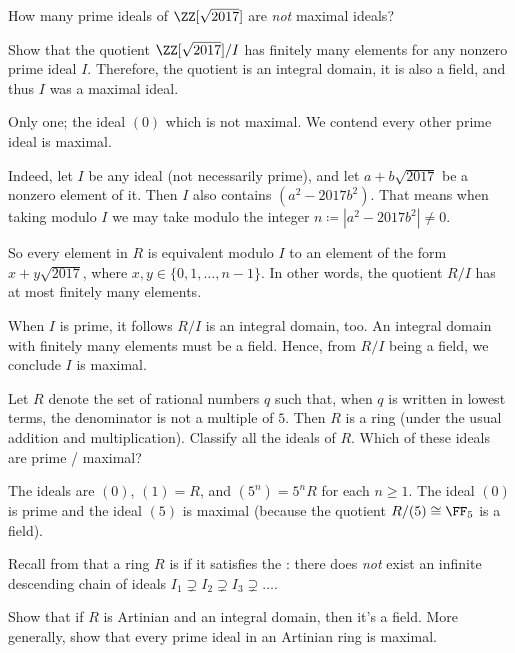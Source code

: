 \begin{dproblem}
	How many prime ideals of $\ZZ[\sqrt{2017}]$ are \emph{not} maximal ideals?
	\label{prob:dedekind_sample}
	\begin{hint}
		Show that the quotient $\ZZ[\sqrt{2017}]/I$ has finitely many elements
		for any nonzero prime ideal $I$.
		Therefore, the quotient is an integral domain, it is also a field,
		and thus $I$ was a maximal ideal.
	\end{hint}
	\begin{sol}
		Only one; the ideal $(0)$ which is not maximal.
		We contend every other prime ideal is maximal.

		Indeed, let $I$ be any ideal (not necessarily prime),
		and let $a + b \sqrt{2017}$ be a nonzero element of it.
		Then $I$ also contains $(a^2-2017b^2)$.
		That means when taking modulo $I$ we may take modulo the integer
		$n \coloneqq |a^2-2017b^2| \neq 0$.

		So every element in $R$ is equivalent modulo $I$
		to an element of the form $x + y \sqrt{2017}$,
		where $x,y \in \{0, 1, \dots, n-1\}$.
		In other words, the quotient $R/I$ has at most finitely many elements.

		When $I$ is prime, it follows $R/I$ is an integral domain, too.
		An integral domain with finitely many elements must be a field.
		Hence, from $R/I$ being a field, we conclude $I$ is maximal.
	\end{sol}
\end{dproblem}

\begin{problem}
	Let $R$ denote the set of rational numbers $q$ such that,
	when $q$ is written in lowest terms, the denominator is not a multiple of $5$.
	Then $R$ is a ring (under the usual addition and multiplication).
	Classify all the ideals of $R$.
	Which of these ideals are prime / maximal?
	\begin{sol}
		The ideals are $(0)$, $(1) = R$, and $(5^n) = 5^n R$ for each $n \ge 1$.
		The ideal $(0)$ is prime and the ideal $(5)$ is maximal
		(because the quotient $R/(5) \cong \FF_5$ is a field).
	\end{sol}
\end{problem}

\begin{problem}
	Recall from  that a ring $R$ is 
	if it satisfies the :
	there does \emph{not} exist an infinite descending chain of ideals
	$I_1 \supsetneq I_2 \supsetneq I_3 \supsetneq \dots$.
	\begin{enumerate}[(a)]
		\ii Show that if $R$ is Artinian and an integral domain, then it's a field.
		\ii More generally, show that every prime ideal in an Artinian ring is maximal.
	\end{enumerate}
\end{problem}
